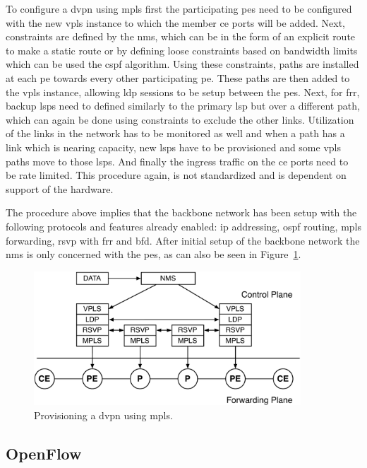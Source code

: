 To configure a \ac{dvpn} using \ac{mpls} first the participating \acp{pe} need to be configured with the new \ac{vpls} instance to which the member \ac{ce} ports will be added. Next, constraints are defined by the \ac{nms}, which can be in the form of an explicit route to make a static route or by defining loose constraints based on bandwidth limits which can be used the \ac{cspf} algorithm. Using these constraints, paths are installed at each \ac{pe} towards every other participating \ac{pe}. These paths are then added to the \ac{vpls} instance, allowing \ac{ldp} sessions to be setup between the \acp{pe}. Next, for \ac{frr}, backup \acp{lsp} need to defined similarly to the primary \ac{lsp} but over a different path, which can again be done using constraints to exclude the other links. Utilization of the links in the network has to be monitored as well and when a path has a link which is nearing capacity, new \acp{lsp} have to be provisioned and some \ac{vpls} paths move to those \acp{lsp}. And finally the ingress traffic on the \ac{ce} ports need to be rate limited. This procedure again, is not standardized and is dependent on support of the hardware.

The procedure above implies that the backbone network has been setup with the following protocols and features already enabled: \ac{ip} addressing, \ac{ospf} routing, \ac{mpls} forwarding, \ac{rsvp} with \ac{frr} and \ac{bfd}. After initial setup of the backbone network the \ac{nms} is only concerned with the \acp{pe}, as can also be seen in Figure~\ref{fig:nms-stack}.

\begin{figure}[!h]
	\centering
	\includegraphics[width=10cm]{./includes/nms-stack.pdf}
	\caption{Provisioning a \ac{dvpn} using \ac{mpls}.}
	\label{fig:nms-stack}
\end{figure}



\subsection{OpenFlow} %
\label{sub:openflow}

